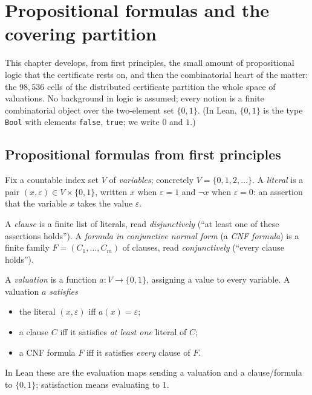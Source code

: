 \chapter{Propositional formulas and the covering partition}\label{sec:coverage}

This chapter develops, from first principles, the small amount of
propositional logic that the certificate rests on, and then the combinatorial
heart of the matter: the $98{,}536$ cells of the distributed certificate
partition the whole space of valuations.  No background in logic is assumed;
every notion is a finite combinatorial object over the two-element set
$\{0,1\}$.  (In Lean, $\{0,1\}$ is the type \texttt{Bool} with elements
\texttt{false}, \texttt{true}; we write $0$ and $1$.)

\section{Propositional formulas from first principles}

\begin{definition}\label{def:cnf-literal}
Fix a countable index set $V$ of \emph{variables}; concretely $V = \{0, 1, 2, \dots\}$.  A
\emph{literal} is a pair $(x, \varepsilon) \in V \times \{0,1\}$, written
$x$ when $\varepsilon = 1$ and $\neg x$ when $\varepsilon = 0$: an assertion
that the variable $x$ takes the value $\varepsilon$.
\leanok
\end{definition}

\begin{definition}\label{def:cnf-formula}
A \emph{clause} is a finite list of literals, read \emph{disjunctively}
(``at least one of these assertions holds'').  A \emph{formula in
conjunctive normal form} (a \emph{CNF formula}) is a finite family
$F = (C_1, \dots, C_m)$ of clauses, read \emph{conjunctively} (``every
clause holds'').
\leanok
{}
\end{definition}

\begin{definition}\label{def:cnf-valuation}
A \emph{valuation} is a function $a \colon V \to \{0,1\}$, assigning a value
to every variable.  A valuation $a$ \emph{satisfies}
\begin{itemize}
\item the literal $(x, \varepsilon)$ iff $a(x) = \varepsilon$;
\item a clause $C$ iff it satisfies \emph{at least one} literal of $C$;
\item a CNF formula $F$ iff it satisfies \emph{every} clause of $F$.
\end{itemize}
In Lean these are the evaluation maps sending a valuation and a
clause/formula to $\{0,1\}$; satisfaction means evaluating to $1$.
\leanok
{}
\end{definition}

